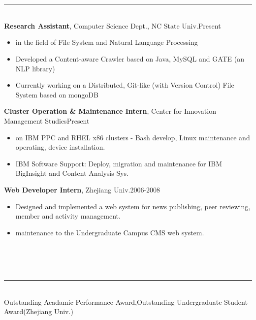 \documentclass[10pt,oneside,letter,final]{article}
\newenvironment{CVsection}[1]{
    \hspace*{20pt}{\bf \Large #1}\\[-3pt]
    \rule[5pt]{\textwidth}{1pt}\\
}{
    \hspace{-10pt}\hfill\\[10pt]
}
\newenvironment{CVexperience}[3]{
    {\bf #1}, #2\hfill #3\\[2pt]
    \begin{itemize}
        \setlength{\parsep}{0pt}
        \setlength{\itemsep}{0pt}\vspace{-16pt}
}{
    \end{itemize}
}
\begin{document}
    \\[-20pt]                                %
    \begin{CVsection}{\Large E\large XPERIENCE}
        \begin{CVexperience}{Research Assistant}{Computer Science Dept., NC State Univ.}{Present}
            \item in the field of File System and Natural Language Processing
            \item Developed a Content-aware Crawler based on Java, MySQL and GATE (an NLP library)
            \item Currently working on a Distributed, Git-like (with Version Control) File System based on mongoDB 
        \end{CVexperience}
        \begin{CVexperience}{Cluster Operation \& Maintenance Intern}{Center for Innovation Management Studies}{Present}
            \item on IBM PPC and RHEL x86 clusters - Bash develop, Linux maintenance and operating, device installation.
            \item IBM Software Support: Deploy, migration and maintenance for IBM BigInsight and Content Analysis Sys.
        \end{CVexperience}
        
        \begin{CVexperience}{Web Developer Intern}{Zhejiang Univ.}{2006-2008}
            \item Designed and implemented a web system for news publishing, peer reviewing, member and activity management.
            \item maintenance to the Undergraduate Campus CMS web system.
        \end{CVexperience}
    \end{CVsection}
    \\[-20pt]
    \begin{CVsection}{\Large H\large ONORS}
        Outstanding Acadamic Performance Award,\quad Outstanding Undergraduate Student Award\hfill (Zhejiang Univ.)
    \end{CVsection}
\end{document}

